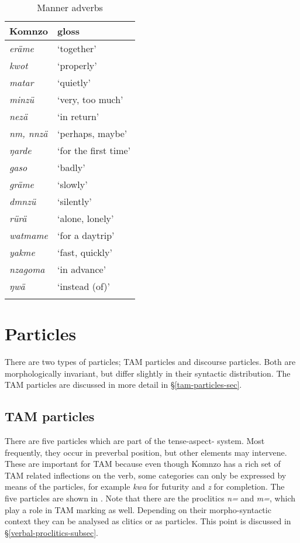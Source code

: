 \begin{table}
\caption{Manner adverbs}
\label{manner-adverbs-table}
	\begin{tabularx}{.5\textwidth}{Xl}
		\lsptoprule
		Komnzo&gloss\\\midrule
		\emph{eräme}&`together'\\
		\emph{kwot}&`properly'\\
		\emph{matar}&`quietly'\\
		\emph{minzü}&`very, too much'\\
		\emph{nezä}&`in return'\\
		\emph{nm, nnzä}&`perhaps, maybe'\\
		\emph{ŋarde}&`for the first time'\\
		\emph{gaso}&`badly'\\
		\emph{gräme}&`slowly'\\
		\emph{dmnzü}&`silently'\\
		\emph{rürä}&`alone, lonely'\\
		\emph{watmame}&`for a daytrip'\\
		\emph{yakme}&`fast, quickly'\\
		\emph{nzagoma}&`in advance'\\
		\emph{ŋwä}&`instead (of)'\\
		\lspbottomrule
	\end{tabularx}
\end{table}%

\section{Particles} \label{particles-sec}

There are two types of particles; TAM particles and discourse particles. Both are morphologically invariant, but differ slightly in their syntactic distribution. The TAM particles are discussed in more detail in {\S}\ref{tam-particles-sec}.

\subsection{TAM particles} \label{tam-particles-subsec}
\largerpage
There are five particles which are part of the tense-aspect- system. Most frequently, they occur in preverbal position, but other elements may intervene. These are important for TAM because even though Komnzo has a rich set of TAM related inflections on the verb, some categories can only be expressed by means of the particles, for example \emph{kwa} for futurity and \emph{z} for completion. The five particles are shown in . Note that there are the proclitics \emph{n=} and \emph{m=}, which play a role in TAM marking as well. Depending on their morpho-syntactic context they can be analysed as clitics or as particles. This point is discussed in {\S}\ref{verbal-proclitics-subsec}.

